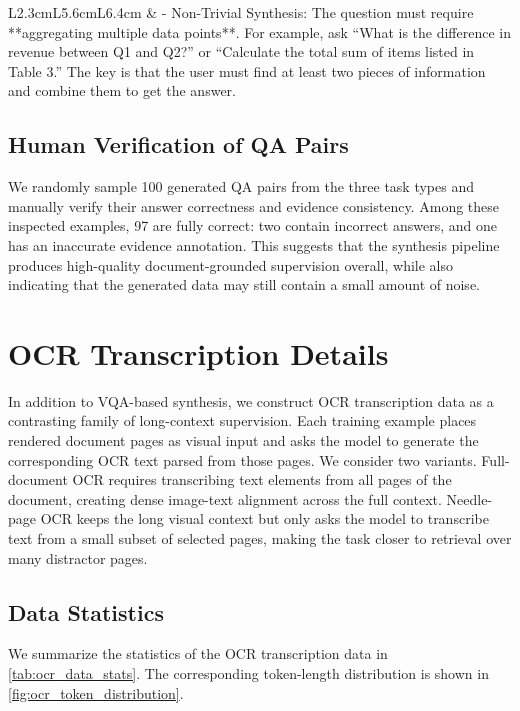 \documentclass{llmxive}
\begin{document}
{{{\begin{table}[!htbp]
\begin{tabular}{L{2.3cm}L{5.6cm}L{6.4cm}}
 & - Non-Trivial Synthesis: The question must require **aggregating multiple data points**. For example, ask ``What is the difference in revenue between Q1 and Q2?'' or ``Calculate the total sum of items listed in Table 3.'' The key is that the user must find at least two pieces of information and combine them to get the answer. \\
 \bottomrule
 \end{tabular}
\caption{The task descriptions and extra restriction for the three long-document VQA tasks. We insert these parts into the prompt template to synthesize data.}
\label{tab:qa_generation_task_fields}
\end{table}

\subsection{Human Verification of QA Pairs}
\label{app:long_document_vqa_details:verification}
We randomly sample 100 generated QA pairs from the three task types and manually verify their answer correctness and evidence consistency.
Among these inspected examples, 97 are fully correct: two contain incorrect answers, and one has an inaccurate evidence annotation.
This suggests that the synthesis pipeline produces high-quality document-grounded supervision overall, while also indicating that the generated data may still contain a small amount of noise.

\section{OCR Transcription Details}
\label{app:ocr_transcription_details}
In addition to VQA-based synthesis, we construct OCR transcription data as a contrasting family of long-context supervision.
Each training example places rendered document pages as visual input and asks the model to generate the corresponding OCR text parsed from those pages.
We consider two variants.
Full-document OCR requires transcribing text elements from all pages of the document, creating dense image-text alignment across the full context.
Needle-page OCR keeps the long visual context but only asks the model to transcribe text from a small subset of selected pages, making the task closer to retrieval over many distractor pages.

\subsection{Data Statistics}
\label{app:ocr_transcription_details:data_stats}
We summarize the statistics of the OCR transcription data in \cref{tab:ocr_data_stats}.
The corresponding token-length distribution is shown in \cref{fig:ocr_token_distribution}.

}}}
\end{document}
